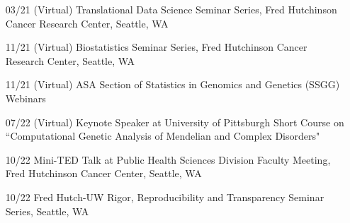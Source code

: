 \documentclass[10pt]{article}
\begin{document}
\begin{enumerate}
\item[03/21] (Virtual) Translational Data Science Seminar Series, Fred Hutchinson Cancer Research Center, Seattle, WA
\item[11/21]  (Virtual) Biostatistics Seminar Series, Fred Hutchinson Cancer Research Center, Seattle, WA
\item[11/21]  (Virtual) ASA Section of Statistics in Genomics and Genetics (SSGG) Webinars
\item[07/22] (Virtual) Keynote Speaker at University of Pittsburgh Short Course on ``Computational Genetic Analysis of Mendelian and Complex Disorders" 
\item[10/22] Mini-TED Talk at Public Health Sciences Division Faculty Meeting, Fred Hutchinson Cancer Center, Seattle, WA
\item[10/22] Fred Hutch-UW Rigor, Reproducibility and Transparency Seminar Series, Seattle, WA

\end{enumerate}
\end{document}
